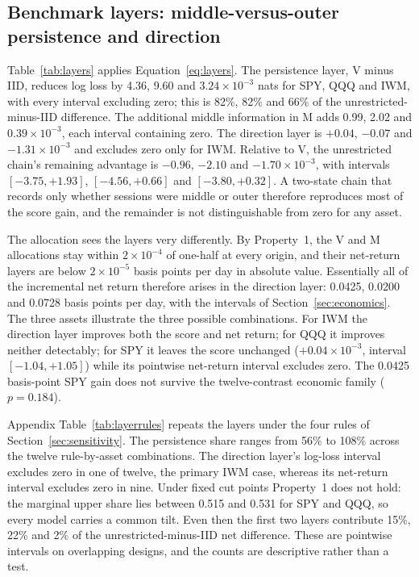 \subsection{Benchmark layers: middle-versus-outer persistence and direction}\label{sec:layers}
Table~\ref{tab:layers} applies Equation~\eqref{eq:layers}. The persistence layer, V minus IID, reduces log loss by 4.36, 9.60 and $3.24\times10^{-3}$ nats for SPY, QQQ and IWM, with every interval excluding zero; this is 82\%, 82\% and 66\% of the unrestricted-minus-IID difference. The additional middle information in M adds 0.99, 2.02 and $0.39\times10^{-3}$, each interval containing zero. The direction layer is $+0.04$, $-0.07$ and $-1.31\times10^{-3}$ and excludes zero only for IWM. Relative to V, the unrestricted chain's remaining advantage is $-0.96$, $-2.10$ and $-1.70\times10^{-3}$, with intervals $[-3.75,+1.93]$, $[-4.56,+0.66]$ and $[-3.80,+0.32]$. A two-state chain that records only whether sessions were middle or outer therefore reproduces most of the score gain, and the remainder is not distinguishable from zero for any asset.

The allocation sees the layers very differently. By Property~1, the V and M allocations stay within $2\times10^{-4}$ of one-half at every origin, and their net-return layers are below $2\times10^{-5}$ basis points per day in absolute value. Essentially all of the incremental net return therefore arises in the direction layer: 0.0425, 0.0200 and 0.0728 basis points per day, with the intervals of Section~\ref{sec:economics}. The three assets illustrate the three possible combinations. For IWM the direction layer improves both the score and net return; for QQQ it improves neither detectably; for SPY it leaves the score unchanged ($+0.04\times10^{-3}$, interval $[-1.04,+1.05]$) while its pointwise net-return interval excludes zero. The 0.0425 basis-point SPY gain does not survive the twelve-contrast economic family ($p=0.184$).

Appendix Table~\ref{tab:layerrules} repeats the layers under the four rules of Section~\ref{sec:sensitivity}. The persistence share ranges from 56\% to 108\% across the twelve rule-by-asset combinations. The direction layer's log-loss interval excludes zero in one of twelve, the primary IWM case, whereas its net-return interval excludes zero in nine. Under fixed cut points Property~1 does not hold: the marginal upper share lies between 0.515 and 0.531 for SPY and QQQ, so every model carries a common tilt. Even then the first two layers contribute 15\%, 22\% and 2\% of the unrestricted-minus-IID net difference. These are pointwise intervals on overlapping designs, and the counts are descriptive rather than a test.

